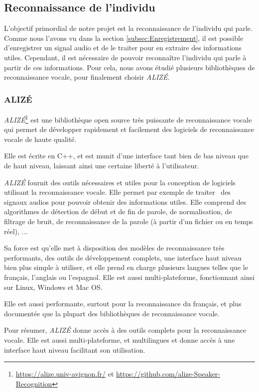 
\subsection{Reconnaissance de l'individu}
\label{subsec:Reconnaissance_individu}

L'objectif primordial de notre projet est la reconnaissance de l'individu qui parle. Comme nous l'avons vu dans la section \ref{subsec:Enregistrement}, il est
possible d'enregistrer un signal audio et de le traiter pour en extraire des informations utiles. Cependant, il est nécessaire de pouvoir reconnaître
l'individu qui parle à partir de ces informations. Pour cela, nous avons étudié plusieurs bibliothèques de reconnaissance vocale, pour finalement choisir
\textit{ALIZÉ}.


\subsubsection{ALIZÉ}
\textit{ALIZÉ}\footnote{\url{https://alize.univ-avignon.fr/} et \url{https://github.com/alize-Speaker-Recognition}} est une bibliothèque open source très
puissante de reconnaissance vocale qui permet de développer rapidement et facilement des logiciels de reconnaissance vocale de haute qualité.

Elle est écrite en C++, et est munit d'une interface tant bien de bas niveau que de haut niveau, laissant ainsi une certaine liberté à l'utilisateur.


\textit{ALIZÉ} fournit des outils nécessaires et utiles pour la conception de logiciels utilisant la reconnaissance vocale. Elle permet par exemple de traiter \
des signaux audios pour pouvoir obtenir des informations utiles. Elle comprend des algorithmes de détection de début et de fin de parole, de normalisation, de
filtrage de bruit, de reconnaissance de la parole (à partir d'un fichier ou en temps réel), ...

Sa force est qu'elle met à disposition des modèles de reconnaissance très performants, des outils de développement complets, une interface haut niveau bien
plus simple à utiliser, et elle prend en charge plusieurs langues telles que le français, l'anglais ou l'espagnol. Elle est aussi multi-plateforme,
fonctionnant ainsi sur Linux, Windows et Mac OS.

Elle est aussi performante, surtout pour la reconnaissance du français, et plus documentée que la plupart des bibliothèques de reconnaissance vocale.

Pour résumer, \textit{ALIZÉ} donne accès à des outils complets pour la reconnaissance vocale. Elle est aussi multi-plateforme, et multilingues et donne accès
à une interface haut niveau facilitant son utilisation.

